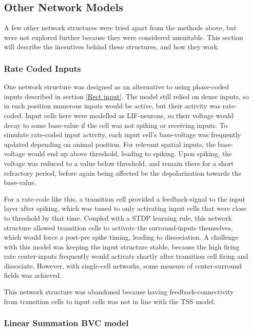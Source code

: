 \documentclass{article}
\begin{document}
    \subsection{Other Network Models} \label{Other Models}

    A few other network structures were tried apart from the methods above, but were not explored further because they were considered unsuitable. This section will describe the incentives behind these structures, and how they work.

    \subsubsection{Rate Coded Inputs} \label{Rate input}
    
    One network structure was designed as an alternative to using phase-coded inputs described in section \ref{Rect input}. The model still relied on dense inputs, so in each position numerous inputs would be active, but their activity was rate-coded. Input cells here were modelled as LIF-neurons, so their voltage would decay to some base-value if the cell was not spiking or receiving inputs. To simulate rate-coded input activity, each input cell's base-voltage was frequently updated depending on animal position. For relevant spatial inputs, the base-voltage would end up above threshold, leading to spiking. Upon spiking, the voltage was reduced to a value below threshold, and remain there for a short refractory period, before again being affected be the depolarization towards the base-value.

    For a rate-code like this, a transition cell provided a feedback-signal to the input layer after spiking, which was tuned to only activating input cells that were close to threshold by that time. Coupled with a STDP learning rule, this network structure allowed transition cells to activate the surround-inputs themselves, which would force a post-pre spike timing, leading to dissociation. A challenge with this model was keeping the input structure stable, because the high firing rate center-inputs frequently would activate shortly after transition cell firing and dissociate. However, with single-cell networks, some measure of center-surround fields was achieved.

    This network structure was abandoned because having feedback-connectivity from transition cells to input cells was not in line with the TSS model.

    \subsubsection{Linear Summation BVC model} \label{LinnSummBVC}
    
\end{document}
